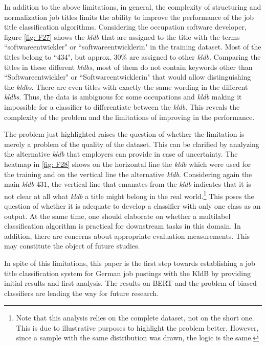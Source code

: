 \documentclass[12pt, a4paper, titlepage]{article}
\begin{document}
In addition to the above limitations, in general, the complexity of structuring and normalization job titles limits the ability to improve the performance of the job title classification algorithms. Considering the occupation software developer, figure \ref{fig: F27} shows the \textit{kldb} that are assigned to the title with the terms ``softwareentwickler" or ``softwareentwicklerin" in the training dataset. Most of the titles belong to ``434", but approx. $30\%$ are assigned to other \textit{kldb}. Comparing the titles in these different \textit{kldbs}, most of them do not contain keywords other than ``Softwareentwickler" or ``Softwareentwicklerin" that would allow distinguishing the \textit{kldbs}. There are even titles with exactly the same wording in the different \textit{kldbs}. Thus, the data is ambiguous for some occupations and \textit{kldb} making it impossible for a classifier to differentiate between the \textit{kldb}. This reveals the complexity of the problem and the limitations of improving in the performance. 

The problem just highlighted raises the question of whether the limitation is merely a problem of the quality of the dataset. This can be clarified by analyzing the alternative \textit{kldb} that employers can provide in case of uncertainty. The heatmap in \ref{fig: F28} shows on the horizontal line the \textit{kldb} which were used for the training and on the vertical line the alternative \textit{kldb}. Considering again the main \textit{kldb} $431$, the vertical line that emanates from the \textit{kldb} indicates that it is not clear at all what \textit{kldb} a title might belong in the real world.\footnote{Note that this analysis relies on the complete dataset, not on the short one. This is due to illustrative purposes to highlight the problem better. However, since a sample with the same distribution was drawn, the logic is the same.} This poses the question of whether it is adequate to develop a classifier with only one class as an output. At the same time, one should elaborate on whether a multilabel classification algorithm is practical for downstream tasks in this domain. In addition, there are concerns about appropriate evaluation measurements. This may constitute the object of future studies.

In spite of this limitations, this paper is the first step towards establishing a job title classification system for German job postings with the \ac{KldB} by providing initial results and first analysis. The results on \ac{BERT} and the problem of biased classifiers are leading the way for future research. 
\end{document}
